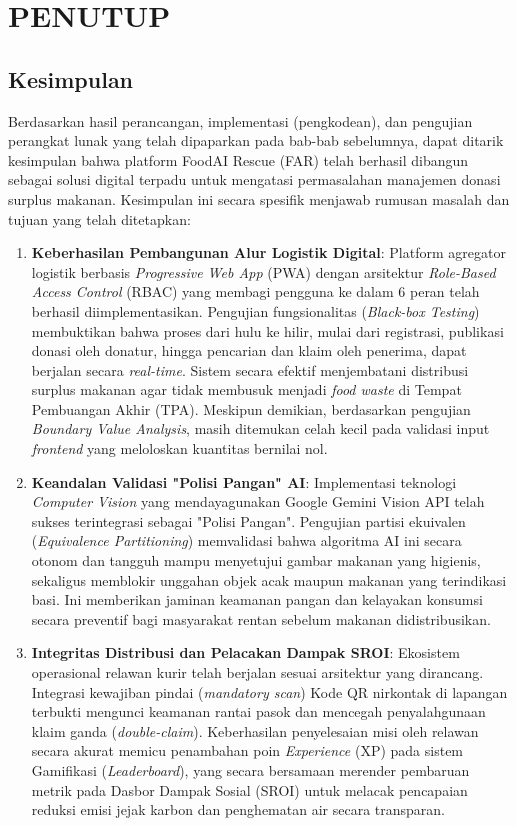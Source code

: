 \chapter{PENUTUP}
\label{chapter:PENUTUP}

\section{Kesimpulan}

Berdasarkan hasil perancangan, implementasi (pengkodean), dan pengujian perangkat lunak yang telah dipaparkan pada bab-bab sebelumnya, dapat ditarik kesimpulan bahwa platform FoodAI Rescue (FAR) telah berhasil dibangun sebagai solusi digital terpadu untuk mengatasi permasalahan manajemen donasi surplus makanan. Kesimpulan ini secara spesifik menjawab rumusan masalah dan tujuan yang telah ditetapkan:

\begin{enumerate}[label=\arabic*.]
    \item \textbf{Keberhasilan Pembangunan Alur Logistik Digital}: Platform agregator logistik berbasis \textit{Progressive Web App} (PWA) dengan arsitektur \textit{Role-Based Access Control} (RBAC) yang membagi pengguna ke dalam 6 peran telah berhasil diimplementasikan. Pengujian fungsionalitas (\textit{Black-box Testing}) membuktikan bahwa proses dari hulu ke hilir, mulai dari registrasi, publikasi donasi oleh donatur, hingga pencarian dan klaim oleh penerima, dapat berjalan secara \textit{real-time}. Sistem secara efektif menjembatani distribusi surplus makanan agar tidak membusuk menjadi \textit{food waste} di Tempat Pembuangan Akhir (TPA). Meskipun demikian, berdasarkan pengujian \textit{Boundary Value Analysis}, masih ditemukan celah kecil pada validasi input \textit{frontend} yang meloloskan kuantitas bernilai nol.
    \item \textbf{Keandalan Validasi "Polisi Pangan" AI}: Implementasi teknologi \textit{Computer Vision} yang mendayagunakan Google Gemini Vision API telah sukses terintegrasi sebagai "Polisi Pangan". Pengujian partisi ekuivalen (\textit{Equivalence Partitioning}) memvalidasi bahwa algoritma AI ini secara otonom dan tangguh mampu menyetujui gambar makanan yang higienis, sekaligus memblokir unggahan objek acak maupun makanan yang terindikasi basi. Ini memberikan jaminan keamanan pangan dan kelayakan konsumsi secara preventif bagi masyarakat rentan sebelum makanan didistribusikan. 
    \item \textbf{Integritas Distribusi dan Pelacakan Dampak SROI}: Ekosistem operasional relawan kurir telah berjalan sesuai arsitektur yang dirancang. Integrasi kewajiban pindai (\textit{mandatory scan}) Kode QR nirkontak di lapangan terbukti mengunci keamanan rantai pasok dan mencegah penyalahgunaan klaim ganda (\textit{double-claim}). Keberhasilan penyelesaian misi oleh relawan secara akurat memicu penambahan poin \textit{Experience} (XP) pada sistem Gamifikasi (\textit{Leaderboard}), yang secara bersamaan merender pembaruan metrik pada Dasbor Dampak Sosial (SROI) untuk melacak pencapaian reduksi emisi jejak karbon dan penghematan air secara transparan.
\end{enumerate}

